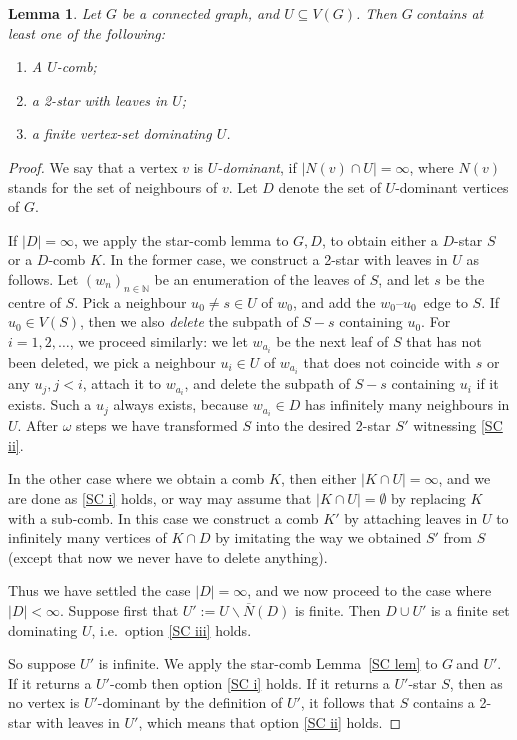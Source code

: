 \documentclass{article}
\newcommand{\defi}[1]{{\color{darkgray}\emph{#1}}}
\newtheorem{lemma}[proposition]{Lemma}
\newcommand{\N}{\ensuremath{\mathbb N}}
\newcommand{\sm}{\backslash}
\newcommand{\cls}[1]{\ensuremath{\overline{#1}}}
\newcommand{\seq}[1]{\ensuremath{(#1_n)_{n\in\N}}}
\newcommand{\g}{\ensuremath{G\ }}
\newcommand{\G}{\ensuremath{G}}
\newcommand{\Lr}[1]{Lemma~\ref{#1}}
\begin{document}
\begin{lemma} \label{2star comb}
Let $G$ be a connected graph, and $U\subseteq V(G)$. Then \g contains at least one of the following:
\begin{enumerate}
	\item \label{SC i} A $U$-comb;
	\item \label{SC ii} a 2-star with leaves in $U$;
	\item \label{SC iii} a finite vertex-set dominating $U$.
\end{enumerate}
\end{lemma}
\begin{proof}
We say that a vertex $v$ is \defi{$U$-dominant}, if $|N(v) \cap U|=\infty$, where $N(v)$ stands for the set of neighbours of $v$. Let $D$ denote the set of $U$-dominant vertices of \G.

If $|D|=\infty$, we apply the star-comb lemma to $G,D$, to obtain either a $D$-star $S$ or a $D$-comb $K$. In the former case, we construct a 2-star with leaves in $U$ as follows. Let $\seq{w}$ be an enumeration of the leaves of $S$, and let $s$ be the centre of $S$. Pick a neighbour $u_0\neq s\in U$ of $w_0$, and add the $w_0$--$u_0$~edge to $S$. If $u_0\in V(S)$, then we also \defi{delete} the subpath of $S - s$ containing $u_0$. For $i=1,2,\ldots$, we proceed similarly: we let $w_{a_i}$ be the next leaf of $S$ that has not been deleted, we pick a neighbour $u_i\in U$ of $w_{a_i}$ that does not coincide with $s$ or any $u_j, j<i$, attach it to $w_{a_i}$, and delete the subpath of $S - s$ containing $u_i$ if it exists. Such a $u_j$ always exists, because $w_{a_i}\in D$ has infinitely many neighbours in $U$. After $\omega$ steps we have transformed $S$ into the desired 2-star $S'$ witnessing \ref{SC ii}. 

In the other case where we obtain a comb $K$, then either $|K\cap U|=\infty$, and we are done as \ref{SC i} holds, or way may assume that $|K\cap U|=\emptyset$ by replacing $K$ with a sub-comb. In this case we construct a comb $K'$ by attaching leaves in $U$ to infinitely many vertices of $K\cap D$ by imitating the way we obtained $S'$ from $S$ (except that now we never have to delete anything).

\medskip
Thus we have settled the case $|D|=\infty$, and we now proceed to the case where $|D|<\infty$. Suppose first that $U':= U \sm \cls{N}(D)$ is finite. Then $D \cup U'$ is a finite set dominating $U$, i.e.\ option \ref{SC iii} holds. 

So suppose $U'$ is infinite. We apply the star-comb \Lr{SC lem} to \g and $U'$. If it returns a $U'$-comb then option \ref{SC i} holds. If it returns a $U'$-star $S$, then as no vertex is $U'$-dominant by the definition of $U'$, it follows that $S$ contains a 2-star with leaves in $U'$, which means that option \ref{SC ii} holds. 


\end{proof}
\end{document}

